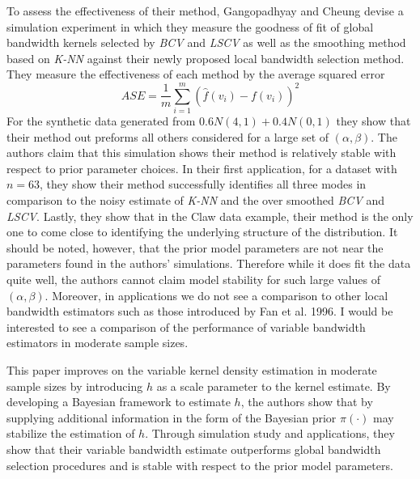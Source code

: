\documentclass[12pt]{article}  %
\begin{document}
To assess the effectiveness of their method, Gangopadhyay and Cheung devise a simulation experiment in which they measure the goodness of fit of global bandwidth kernels selected by \textit{BCV} and \textit{LSCV} as well as the smoothing method based on \textit{K-NN} against their newly proposed local bandwidth selection method. They measure the effectiveness of each method by the average squared error $$ASE = \frac{1}{m}\sum_{i=1}^{m}(\widehat{f}(v_i) - f(v_i))^2$$ For the synthetic data generated from $0.6N(4,1) + 0.4N(0,1)$ they show that their method out preforms all others considered for a large set of $(\alpha, \beta)$. The authors claim that this simulation shows their method is relatively stable with respect to prior parameter choices. In their first application, for a dataset with $n=63$, they show their method successfully identifies all three modes in comparison to the noisy estimate of \textit{K-NN} and the over smoothed \textit{BCV} and \textit{LSCV}. Lastly, they show that in the Claw data example, their method is the only one to come close to identifying the underlying structure of the distribution. It should be noted, however, that the prior model parameters are not near the parameters found in the authors' simulations. Therefore while it does fit the data quite well, the authors cannot claim model stability for such large values of $(\alpha,\beta)$. Moreover, in applications we do not see a comparison to other local bandwidth estimators such as those introduced by Fan et al. 1996. I would be interested to see a comparison of the performance of variable bandwidth estimators in moderate sample sizes.

This paper improves on the variable kernel density estimation in moderate sample sizes by introducing $h$ as a scale parameter to the kernel estimate. By developing a Bayesian framework to estimate $h$, the authors show that by supplying additional information in the form of the Bayesian prior $\pi(\cdot)$ may stabilize the estimation of $h$. Through simulation study and applications, they show that their variable bandwidth estimate outperforms global bandwidth selection procedures and is stable with respect to the prior model parameters. 
\end{document}
